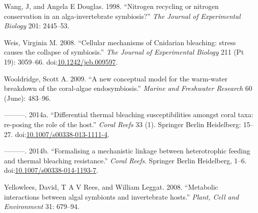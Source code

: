 \documentclass[]{elsarticle} %
\begin{document}
\hypertarget{ref-Wang:1998p128}{}
Wang, J, and Angela E Douglas. 1998. ``Nitrogen recycling or nitrogen
conservation in an alga-invertebrate symbiosis?'' \emph{The Journal of
Experimental Biology} 201: 2445--53.

\hypertarget{ref-Weis:2008p944}{}
Weis, Virginia M. 2008. ``Cellular mechanisms of Cnidarian bleaching:
stress causes the collapse of symbiosis.'' \emph{The Journal of
Experimental Biology} 211 (Pt 19): 3059--66.
doi:\href{https://doi.org/10.1242/jeb.009597}{10.1242/jeb.009597}.

\hypertarget{ref-Wooldridge:2009p7807}{}
Wooldridge, Scott A. 2009. ``A new conceptual model for the warm-water
breakdown of the coral-algae endosymbiosis.'' \emph{Marine and
Freshwater Research} 60 (June): 483--96.

\hypertarget{ref-Wooldridge:2014di}{}
---------. 2014a. ``Differential thermal bleaching susceptibilities
amongst coral taxa: re-posing the role of the host.'' \emph{Coral Reefs}
33 (1). Springer Berlin Heidelberg: 15--27.
doi:\href{https://doi.org/10.1007/s00338-013-1111-4}{10.1007/s00338-013-1111-4}.

\hypertarget{ref-Wooldridge:2014hc}{}
---------. 2014b. ``Formalising a mechanistic linkage between
heterotrophic feeding and thermal bleaching resistance.'' \emph{Coral
Reefs}. Springer Berlin Heidelberg, 1--6.
doi:\href{https://doi.org/10.1007/s00338-014-1193-7}{10.1007/s00338-014-1193-7}.

\hypertarget{ref-Yellowlees:2008p331}{}
Yellowlees, David, T A V Rees, and William Leggat. 2008. ``Metabolic
interactions between algal symbionts and invertebrate hosts.''
\emph{Plant, Cell and Environment} 31: 679--94.
\end{document}
